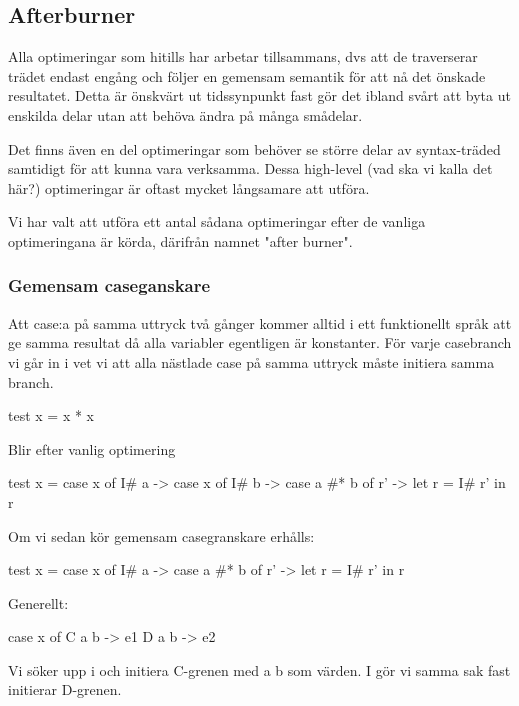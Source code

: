 \documentclass[../Optimise]{subfiles}
\begin{document}
\subsection{Afterburner}

Alla optimeringar som hitills har arbetar tillsammans, dvs att de traverserar trädet endast engång och följer en gemensam semantik för att nå det önskade resultatet. Detta är önskvärt ut tidssynpunkt fast gör det ibland svårt att byta ut enskilda delar utan att behöva ändra på många smådelar.

Det finns även en del optimeringar som behöver se större delar av syntax-träded
samtidigt för att kunna vara verksamma. Dessa high-level (vad ska vi kalla det här?)
optimeringar är oftast mycket långsamare att utföra.

Vi har valt att utföra ett antal sådana optimeringar efter de vanliga
optimeringana är körda, därifrån namnet "after burner".

\subsubsection{Gemensam caseganskare}

Att case:a på samma uttryck två gånger kommer alltid i ett funktionellt språk att ge
samma resultat då alla variabler egentligen är konstanter. För varje casebranch
vi går in i vet vi att alla nästlade case på samma uttryck måste initiera samma
branch.

\begin{codeEx}
test x = x * x
\end{codeEx}

Blir efter vanlig optimering

\begin{codeEx}
test x = case x of
            I# a -> case x of
                I# b -> case a #* b of
                    r' -> let r = I# r'
                            in r
\end{codeEx}

Om vi sedan kör gemensam casegranskare erhålls:
\begin{codeEx}
test x = case x of
            I# a -> case a #* b of
                r' -> let r = I# r'
                    in r
\end{codeEx}

Generellt:
		\begin{codeEx}
case x of
    C a b -> e1
    D a b -> e2
\end{codeEx}

Vi söker upp  i  och initiera 
C-grenen med a b som värden. I  gör vi samma sak fast initierar D-grenen.
\end{document}
